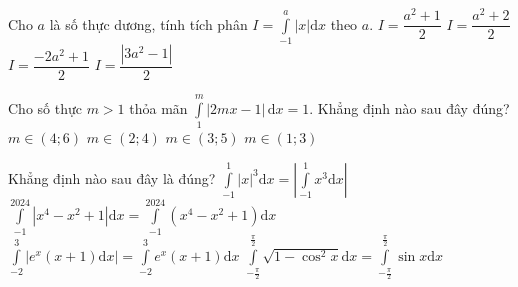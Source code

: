 \begin{ex}%
	Cho $a$ là số thực dương, tính tích phân $I=\displaystyle\int\limits _{-1}^a\left|x\right|\mathrm{d}x$ theo $a$.
	\choice
	{\True $I=\dfrac{a^2+1}{2}$}
	{$I=\dfrac{a^2+2}{2}$}
	{$I=\dfrac{-2a^2+1}{2}$}
	{$I=\dfrac{\left|3a^2-1\right|}{2}$}
\end{ex}
\begin{ex}%
	Cho số thực $m > 1$ thỏa mãn $\displaystyle\int\limits_1^m\left|2mx-1\right|\mathrm{\,d}x=1$. Khẳng định nào sau đây đúng?
	\choice
	{$m\in \left(4;6\right)$}
	{$m\in \left(2;4\right)$}
	{$m\in \left(3;5\right)$}
	{\True $m\in \left(1;3\right)$}
\end{ex}
\begin{ex}%
	Khẳng định nào sau đây là đúng?
	\choice
	{$\displaystyle\int\limits _{-1}^1\left|x\right|^3 \mathrm{d}x=\left|\displaystyle\int\limits _{-1}^1x^3 \mathrm{d}x \right|$}
	{\True $\displaystyle\int\limits _{-1}^{2024}\left|x^4-x^2+1\right|\mathrm{d}x=\displaystyle\int\limits _{-1}^{2024}\left(x^4-x^2+1\right)\mathrm{d}x$}
	{$\displaystyle\int\limits _{-2}^3\left|e^x \left(x+1\right)\mathrm{d}x\right|=\displaystyle\int\limits _{-2}^3e^x \left(x+1\right)\mathrm{d}x$}
	{$\displaystyle\int\limits _{-\tfrac{\pi}{2}}^{\tfrac{\pi}{2}}\sqrt{1-\cos^2 x} \mathrm{d}x=\displaystyle\int\limits _{-\tfrac{\pi}{2}}^{\tfrac{\pi}{2}}\sin x\mathrm{d}x$}
\end{ex}
